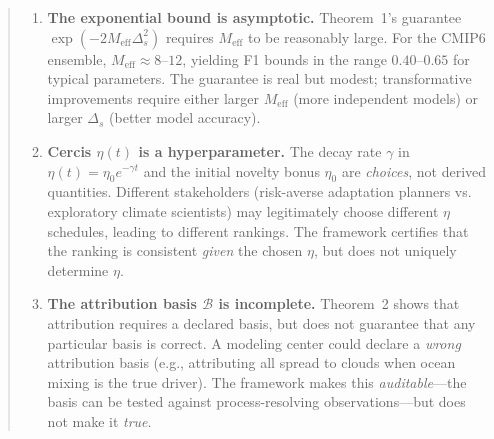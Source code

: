 \documentclass[11pt,a4paper]{article}
\theoremstyle{plain}
\theoremstyle{definition}
\theoremstyle{remark}
\begin{document}
\begin{abstract}
\begin{enumerate}[label=\textbf{L\arabic*}, leftmargin=*]
    precipitation, cloud cover, aerosol loading). For such variables, the
    paleoclimate tier of validation cannot achieve certified status.
  \item \textbf{The exponential bound is asymptotic.}
    Theorem~1's guarantee $\exp(-2M_{\mathrm{eff}}\Delta_s^2)$ requires
    $M_{\mathrm{eff}}$ to be reasonably large. For the CMIP6 ensemble,
    $M_{\mathrm{eff}} \approx 8$--$12$, yielding F1 bounds in the range
    $0.40$--$0.65$ for typical parameters. The guarantee is real but modest;
    transformative improvements require either larger $M_{\mathrm{eff}}$ (more
    independent models) or larger $\Delta_s$ (better model accuracy).
  \item \textbf{Cercis $\eta(t)$ is a hyperparameter.}
    The decay rate $\gamma$ in $\eta(t) = \eta_0 e^{-\gamma t}$ and the initial
    novelty bonus $\eta_0$ are \emph{choices}, not derived quantities. Different
    stakeholders (risk-averse adaptation planners vs. exploratory climate
    scientists) may legitimately choose different $\eta$ schedules, leading to
    different rankings. The framework certifies that the ranking is consistent
    \emph{given} the chosen $\eta$, but does not uniquely determine $\eta$.
  \item \textbf{The attribution basis $\mathcal{B}$ is incomplete.}
    Theorem~2 shows that attribution requires a declared basis, but does not
    guarantee that any particular basis is correct. A modeling center could
    declare a \emph{wrong} attribution basis (e.g., attributing all spread to
    clouds when ocean mixing is the true driver). The framework makes this
    \emph{auditable}---the basis can be tested against process-resolving
    observations---but does not make it \emph{true}.
\end{enumerate}

\end{abstract}
\end{document}
